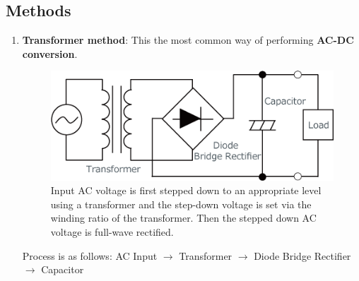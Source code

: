 \subsection{Methods}
\begin{enumerate}
    \item \textbf{Transformer method}: This the most common way of performing \textbf{AC-DC conversion}.
    \begin{figure}[H]
        \centering
        \includegraphics[scale=0.8]{figs/ch03/transformer_ac_dc.png}
        \caption{Input AC voltage is first stepped down to an appropriate level using a transformer and the step-down voltage is set via the winding ratio of the transformer. Then the stepped down AC voltage is full-wave rectified.}
    \end{figure}
    Process is as follows: AC Input $\rightarrow$ Transformer $\rightarrow$ Diode Bridge Rectifier $\rightarrow$ Capacitor


\end{enumerate}
